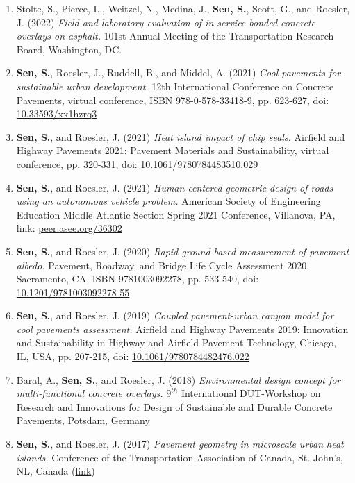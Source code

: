 \documentclass[12pt]{article}
\begin{document}
\begin{enumerate}
	\item Stolte, S., Pierce, L., Weitzel, N., Medina, J., \textbf{Sen, S.}, Scott, G., and Roesler, J. (2022) \textit{Field and laboratory evaluation of in-service bonded concrete overlays on asphalt.} 101st Annual Meeting of the Transportation Research Board, Washington, DC.
	\item \textbf{Sen, S.}, Roesler, J., Ruddell, B., and Middel, A. (2021) \textit{Cool pavements for sustainable urban development.} 12th International Conference on Concrete Pavements, virtual conference, ISBN 978-0-578-33418-9, pp. 623-627, doi: \href{https://doi.org/10.33593/xx1hzrq3}{10.33593/xx1hzrq3}
	\item \textbf{Sen, S.}, and Roesler, J. (2021) \textit{Heat island impact of chip seals.} Airfield and Highway Pavements 2021: Pavement Materials and Sustainability, virtual conference, pp. 320-331, doi: \href{https://doi.org/10.1061/9780784483510.029}{10.1061/9780784483510.029}
	\item \textbf{Sen, S.}, and Roesler, J. (2021) \textit{Human-centered geometric design of roads using an autonomous vehicle problem.} American Society of Engineering Education Middle Atlantic Section Spring 2021 Conference, Villanova, PA, link: \href{https://peer.asee.org/36302}{peer.asee.org/36302}
	\item \textbf{Sen, S.}, and Roesler, J. (2020) \textit{Rapid ground-based measurement of pavement albedo.} Pavement, Roadway, and Bridge Life Cycle Assessment 2020, Sacramento, CA, ISBN 9781003092278, pp. 533-540, doi: \href{https://doi.org/10.1201/9781003092278-55}{10.1201/9781003092278-55}
	\item \textbf{Sen, S.}, and Roesler, J. (2019) \textit{Coupled pavement-urban canyon model for cool pavements assessment.} Airfield and Highway Pavements 2019: Innovation and Sustainability in Highway and Airfield Pavement Technology, Chicago, IL, USA, pp. 207-215, doi: \href{http://dx.doi.org/10.1061/9780784482476.022}{10.1061/9780784482476.022}
	\item Baral, A., \textbf{Sen, S.}, and Roesler, J. (2018) \textit{Environmental design concept for multi-functional concrete overlays.} $9^{th}$ International DUT-Workshop on Research and Innovations for Design of Sustainable and Durable Concrete Pavements, Potsdam, Germany
	\item \textbf{Sen, S.}, and Roesler, J. (2017) \textit{Pavement geometry in microscale urban heat islands.} Conference of the Transportation Association of Canada, St. John’s, NL, Canada (\href{http://www.tac-atc.ca/sites/default/files/conf_papers/sens_-_pavement_geometry_in_microscale_urban_heat_islands.pdf}{link})

\end{enumerate}
\end{document}
